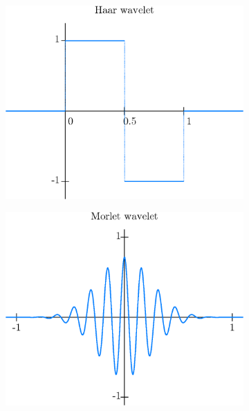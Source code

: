 \begin{figure}[h]
	\centering
	\begin{subfigure}{\minipagewidth}
		\centering
		\includegraphics[width=\textwidth]{figures/haar.eps}
		\caption{}
	\end{subfigure}
	\begin{subfigure}{\minipagewidth}
		\centering
		\includegraphics[width=\textwidth]{figures/morlet.eps}
		\caption{}
	\end{subfigure}
	\newline
	\begin{subfigure}{\minipagewidth}

\end{subfigure}
\end{figure}
